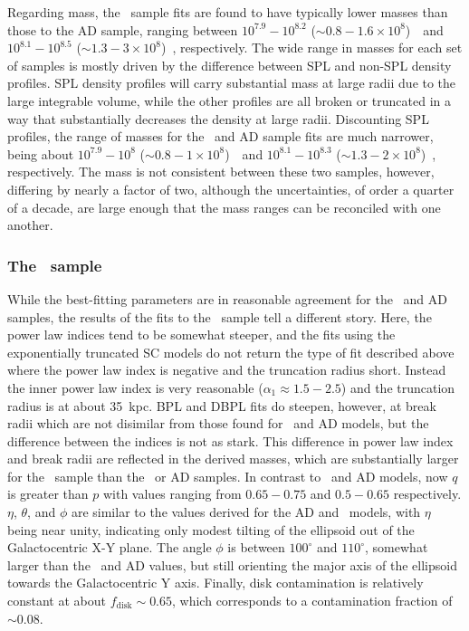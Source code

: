 Regarding mass, the \eLz\ sample fits are found to have typically lower masses than those to the AD sample, ranging between $10^{7.9}-10^{8.2}$ ($\sim 0.8-1.6 \times10^{8}$)~\Msun\ and $10^{8.1}-10^{8.5}$ ($\sim 1.3-3 \times10^{8}$)~\Msun, respectively. The wide range in masses for each set of samples is mostly driven by the difference between SPL and non-SPL density profiles. SPL density profiles will carry substantial mass at large radii due to the large integrable volume, while the other profiles are all broken or truncated in a way that substantially decreases the density at large radii. Discounting SPL profiles, the range of masses for the \eLz\ and AD sample fits are much narrower, being about $10^{7.9}-10^{8}$ ($\sim 0.8-1 \times10^{8}$)~\Msun\ and $10^{8.1}-10^{8.3}$ ($\sim 1.3-2 \times10^{8}$)~\Msun, respectively. The mass is not consistent between these two samples, however, differing by nearly a factor of two, although the uncertainties, of order a quarter of a decade, are large enough that the mass ranges can be reconciled with one another.

\subsubsection{The \JRLz\ sample}

While the best-fitting parameters are in reasonable agreement for the \eLz\ and AD samples, the results of the fits to the \JRLz\ sample tell a different story. Here, the power law indices tend to be somewhat steeper, and the fits using the exponentially truncated SC models do not return the type of fit described above where the power law index is negative and the truncation radius short. Instead the inner power law index is very reasonable ($\alpha_{1} \approx 1.5-2.5$) and the truncation radius is at about 35~kpc. BPL and DBPL fits do steepen, however, at break radii which are not disimilar from those found for \eLz\ and AD models, but the difference between the indices is not as stark. This difference in power law index and break radii are reflected in the derived masses, which are substantially larger for the \JRLz\ sample than the \eLz\ or AD samples. In contrast to \eLz\ and AD models, now $q$ is greater than $p$ with values ranging from $0.65-0.75$ and $0.5-0.65$ respectively. $\eta$, $\theta$, and $\phi$ are similar to the values derived for the AD and \eLz\ models, with $\eta$ being near unity, indicating only modest tilting of the ellipsoid out of the Galactocentric X-Y plane. The angle $\phi$ is between $100^{\circ}$ and $110^{\circ}$, somewhat larger than the \eLz\ and AD values, but still orienting the major axis of the ellipsoid towards the Galactocentric Y axis. Finally, disk contamination is relatively constant at about $f_\mathrm{disk} \sim 0.65$, which corresponds to a contamination fraction of $\sim 0.08$.

